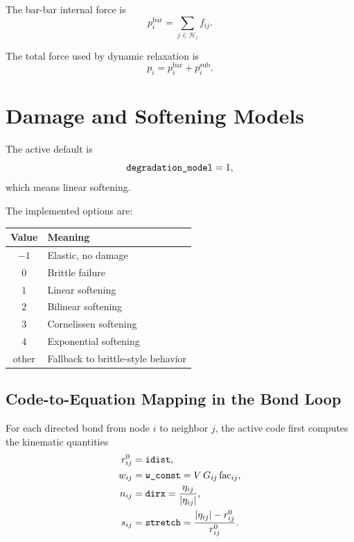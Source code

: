 \documentclass[11pt]{article}
\newcommand{\code}[1]{\texttt{\detokenize{#1}}}
\begin{document}
The bar-bar internal force is
\begin{equation}
    p_i^{\mathrm{bar}}
    =
    \sum_{j\in\mathcal{H}_i}
    f_{ij}.
\end{equation}

The total force used by dynamic relaxation is
\begin{equation}
    p_i =
    p_i^{\mathrm{bar}}
    +
    p_i^{\mathrm{sub}}.
\end{equation}

\section{Damage and Softening Models}

The active default is
\begin{equation}
    \code{degradation_model}=1,
\end{equation}
which means linear softening.

The implemented options are:
\begin{center}
\begin{tabular}{|c|l|}
\hline
\textbf{Value} & \textbf{Meaning} \\
\hline
\(-1\) & Elastic, no damage \\
\(0\) & Brittle failure \\
\(1\) & Linear softening \\
\(2\) & Bilinear softening \\
\(3\) & Cornelissen softening \\
\(4\) & Exponential softening \\
other & Fallback to brittle-style behavior \\
\hline
\end{tabular}
\end{center}

\subsection{Code-to-Equation Mapping in the Bond Loop}

For each directed bond from node \(i\) to neighbor \(j\), the active code first
computes the kinematic quantities
\begin{align}
    r_{ij}^0 &= \code{idist}, \\
    w_{ij} &= \code{w_const}
           = V\,G_{ij}\,\mathrm{fac}_{ij}, \\
    n_{ij} &= \code{dirx}
           = \frac{\eta_{ij}}{|\eta_{ij}|}, \\
    s_{ij} &= \code{stretch}
           = \frac{|\eta_{ij}|-r_{ij}^0}{r_{ij}^0}.
\end{align}
\end{document}
